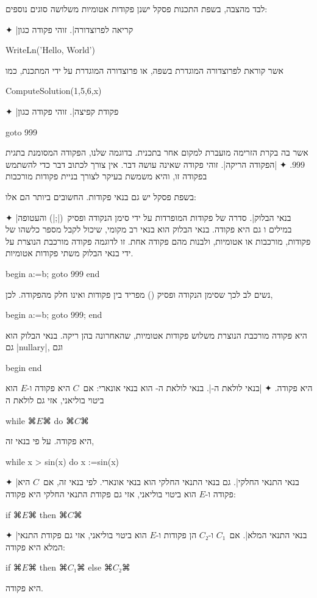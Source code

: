 לבד מהצבה, בשפת התכנות פסקל ישנן פקודות אטומיות משלושה סוגים נוספים:
\begin{enumerate}
  ✦ \ע|קריאה לפרוצדורה|. זוהי פקודה כגון
  \begin{PASCAL}
WriteLn('Hello, World')
\end{PASCAL}
  אשר קוראת לפרוצדורה המוגדרת בשפה, או פרוצדורה המוגדרת על ידי המתכנת, כמו
  \begin{PASCAL}
ComputeSolution(1,5,6,x)
\end{PASCAL}
  ✦ \ע|פקודת קפיצה|. זוהי פקודה כגון
  \begin{PASCAL}
goto 999
\end{PASCAL}
  אשר בה בקרת הזרימה מועברת למקום אחר בתכנית. בדוגמה שלנו, הפקודה המסומנת בתגית
  999.
  ✦ \ע|הפקודה הריקה|. זוהי פקודה שאינה עושה דבר. אין צורך לכתוב דבר כדי
  להשתמש בפקודה זו, והיא משמשת בעיקר לצורך בניית פקודות מורכבות
\end{enumerate}
בשפת פסקל יש גם בנאי פקודות. החשובים ביותר הם אלו:
\begin{enumerate}
  ✦ \ע|בנאי הבלוק|. סדרה של פקודות המופרדות על ידי סימן הנקודה ופסיק~(\T|;|)
  והעטופה במילים  ו גם היא פקודה. בנאי הבלוק הוא בנאי רב
  מקומי, שיכול לקבל מספר כלשהו של פקודות, מורכבות או אטומיות, ולבנות מהם פקודה
  אחת. זו לדוגמה פקודה מורכבת הנוצרת על ידי בנאי הבלוק משתי פקודות אטומיות.
  \begin{PASCAL}
begin
  a:=b;
  goto 999
end
\end{PASCAL}
  נשים לב לכך שסימן הנקודה ופסיק () מפריד בין פקודות ואינו חלק מהפקודה.
  לכן,
  \begin{PASCAL}
begin
  a:=b;
  goto 999;
end
\end{PASCAL}
  היא פקודה מורכבת הנוצרת משלוש פקודות אטומיות, שהאחרונה בהן ריקה. בנאי הבלוק הוא
  גם \E|nullary|, וגם
  \begin{PASCAL}
begin
end
\end{PASCAL}
  היא פקודה.
  ✦ \ע|בנאי לולאת ה-|. בנאי לולאת ה- הוא בנאי אונארי:
  אם~$C$ היא פקודה ו-$E$ הוא ביטוי בוליאני, אזי גם לולאת ה
  \begin{PASCAL}
while ⌘$E$⌘ do ⌘$C$⌘
\end{PASCAL}
  היא פקודה. על פי בנאי זה,
  \begin{PASCAL}
while x > sin(x) do x :=sin(x)
\end{PASCAL}
  ✦ \ע|בנאי התנאי החלקי|. גם בנאי התנאי החלקי הוא בנאי אונארי. לפי בנאי זה,
  אם~$C$ היא פקודה ו-$E$ הוא ביטוי בוליאני, אזי גם פקודת התנאי החלקי היא פקודה:
  \begin{PASCAL}
if ⌘$E$⌘ then ⌘$C$⌘
\end{PASCAL}
  ✦ \ע|בנאי התנאי המלא|. אם~$C₁$ ו-$C₂$ הן פקודות ו-$E$ הוא ביטוי בוליאני, אזי
  גם פקודת התנאי המלא היא פקודה:
  \begin{PASCAL}
if ⌘$E$⌘ then ⌘$C₁$⌘ else ⌘$C₂$⌘
\end{PASCAL}
  היא פקודה.
\end{enumerate}

